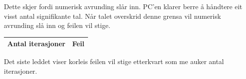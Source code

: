 \documentclass[11pt, a4paper]{article}
\begin{document}
    Dette skjer fordi numerisk avrunding slår inn. PC'en klarer berre å håndtere eit visst antal
    signifikante tal. Når talet overskrid denne grensa vil numerisk avrunding slå inn og feilen vil
    stige.

    \begin{center}
      \begin{tabular}{|l||r|}
        \hline
        Antal iterasjoner & Feil \\
        \hline
        
        \hline
      \end{tabular}
    \end{center}

    Det siste leddet viser korleis feilen vil stige etterkvart som me auker antal iterasjoner.
\end{document}
